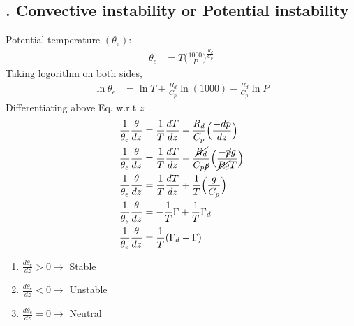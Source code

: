 \documentclass[fleqn,10pt]{SelfArx} %
\begin{document}
\subsection{. Convective instability or Potential instability}
Potential temperature $(\theta_e)$:
\begin{align}
    \theta_e &= T\Big(\frac{1000}{P}\Big)^{\frac{R_d}{C_p}}
\end{align}
Taking logorithm on both sides,
\begin{align}
    \ln{\theta_e} &= \ln{T} + {\frac{R_d}{C_p}}\ln{(1000)} - {\frac{R_d}{C_p}}\ln{P}
\end{align}
Differentiating above Eq. w.r.t $z$
\begin{align}
    \frac{1}{\theta_e}\frac{\theta}{dz} &= \frac{1}{T}\frac{dT}{dz} - \frac{R_d}{C_p}\Big(\frac{-dp}{dz}\Big) \\
    \frac{1}{\theta_e}\frac{\theta}{dz} &= \frac{1}{T}\frac{dT}{dz} - \frac{\cancel{R_d}}{C_p \cancel{p}}\Big(\frac{-\cancel{p}g}{\cancel{R_d}T}\Big) \\
    \frac{1}{\theta_e}\frac{\theta}{dz} &= \frac{1}{T}\frac{dT}{dz} + \frac{1}{T}\Big(\frac{g}{C_p}\Big) \\
    \frac{1}{\theta_e}\frac{\theta}{dz} &= -\frac{1}{T}\Gamma + \frac{1}{T}\Gamma_d \\
    \frac{1}{\theta_e}\frac{\theta}{dz} &= \frac{1}{T}(\Gamma_d - \Gamma)
\end{align}

\begin{enumerate}[noitemsep]
    \item $\frac{d\theta_e}{dz} > 0 \rightarrow $ Stable
    \item $\frac{d\theta_e}{dz} < 0 \rightarrow $ Unstable
    \item $\frac{d\theta_e}{dz} = 0 \rightarrow $ Neutral
\end{enumerate}
\end{document}
